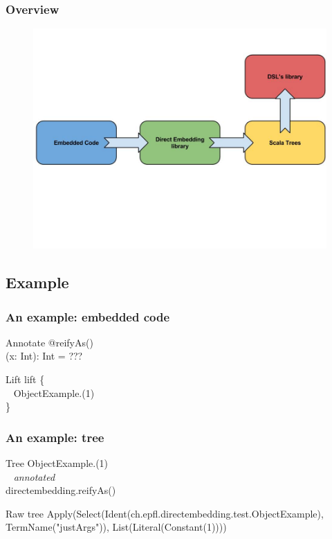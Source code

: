 \documentclass{beamer}
\begin{document}

\begin{frame}
\frametitle{Overview}
\begin{figure}
\includegraphics[width=0.8\linewidth]{./img/flow.jpg}
\end{figure}
\end{frame}

\subsection{Example}

\begin{frame}
\frametitle{An example: embedded code}
\begin{block}{Annotate}
@reifyAs()\\
 (x: Int): Int = ???
\end{block}

\begin{block}{Lift}
lift \{\\
~ ObjectExample.(1)\\
\}
\end{block}

\end{frame}


\begin{frame}
\frametitle{An example: tree}
\begin{block}{Tree}
ObjectExample.(1)\\
~ \textit{annotated}\\
directembedding.reifyAs()\\
\end{block}

\begin{block}{Raw tree}
Apply(Select(Ident(ch.epfl.directembedding.test.ObjectExample), TermName("justArgs")), List(Literal(Constant(1))))
\end{block}

\end{frame}
\end{document}
